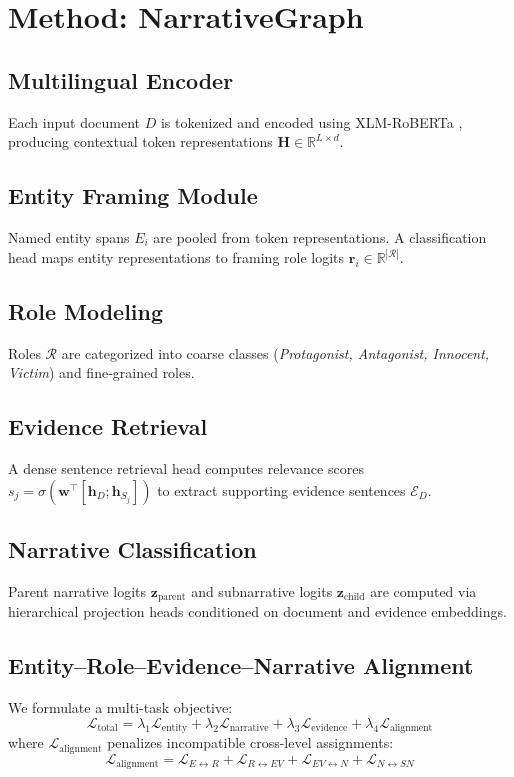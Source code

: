 \documentclass[11pt,a4paper]{article}
\begin{document}
\section{Method: NarrativeGraph}
\subsection{Multilingual Encoder}
Each input document $D$ is tokenized and encoded using XLM-RoBERTa \citep{conneau2020unsupervised}, producing contextual token representations $\mathbf{H} \in \mathbb{R}^{L \times d}$.

\subsection{Entity Framing Module}
Named entity spans $E_i$ are pooled from token representations. A classification head maps entity representations to framing role logits $\mathbf{r}_i \in \mathbb{R}^{|\mathcal{R}|}$.

\subsection{Role Modeling}
Roles $\mathcal{R}$ are categorized into coarse classes (\textit{Protagonist, Antagonist, Innocent, Victim}) and fine-grained roles.

\subsection{Evidence Retrieval}
A dense sentence retrieval head computes relevance scores $s_j = \sigma(\mathbf{w}^\top [\mathbf{h}_D; \mathbf{h}_{S_j}])$ to extract supporting evidence sentences $\mathcal{E}_D$.

\subsection{Narrative Classification}
Parent narrative logits $\mathbf{z}_{\text{parent}}$ and subnarrative logits $\mathbf{z}_{\text{child}}$ are computed via hierarchical projection heads conditioned on document and evidence embeddings.

\subsection{Entity--Role--Evidence--Narrative Alignment}
We formulate a multi-task objective:
\begin{equation}
\mathcal{L}_{\text{total}} = \lambda_1 \mathcal{L}_{\text{entity}} + \lambda_2 \mathcal{L}_{\text{narrative}} + \lambda_3 \mathcal{L}_{\text{evidence}} + \lambda_4 \mathcal{L}_{\text{alignment}}
\end{equation}
where $\mathcal{L}_{\text{alignment}}$ penalizes incompatible cross-level assignments:
\begin{equation}
\mathcal{L}_{\text{alignment}} = \mathcal{L}_{E \leftrightarrow R} + \mathcal{L}_{R \leftrightarrow EV} + \mathcal{L}_{EV \leftrightarrow N} + \mathcal{L}_{N \leftrightarrow SN}
\end{equation}
\end{document}
